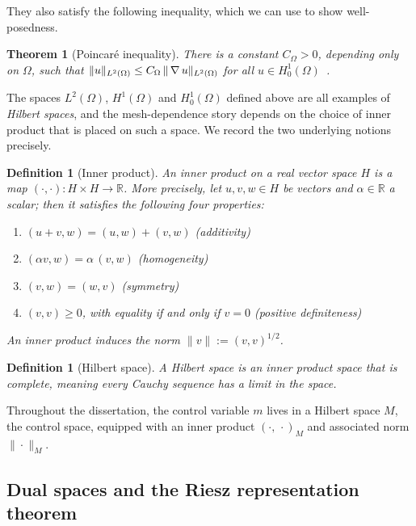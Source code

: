 \documentclass[a4paper,11pt]{article}
\newcommand{\R}{\mathbb{R}}
\newcommand{\Om}{\Omega}
\newcommand{\Lp}[1]{L^{2}(#1)}              %
\newcommand{\inner}[3]{(#1,\,#2)_{#3}}        %
\newcommand{\Mspace}{M}
\theoremstyle{spacedplain} \newtheorem{theorem}[counter]{Theorem} \newtheorem{lemma}[counter]{Lemma} \newtheorem{prop}[counter]{Proposition} \newtheorem{cor}[counter]{Corollary}
\theoremstyle{spaceddefinition} \newtheorem{defn}[counter]{Definition} \newtheorem{example}[counter]{Example} \newtheorem{remark}[counter]{Remark}
\begin{document}
They also satisfy the following inequality, which we can use to show well-posedness.
\begin{theorem}[Poincar\'e inequality]
\label{thm:poincare}
There is a constant $C_\Om > 0$, depending only on $\Om$, such that $\| u \|_{\Lp{\Om}} \le C_\Om\, \| \grad u \|_{\Lp{\Om}}$ for all $u \in H_0^1(\Om)$~\citep{bs2008}.
\end{theorem}

The spaces $\Lp{\Om}$, $H^1(\Om)$ and $H_0^1(\Om)$ defined above are all examples of \emph{Hilbert spaces}, and the mesh-dependence story depends on the choice of inner product that is placed on such a space. We record the two underlying notions precisely.

\begin{defn}[Inner product]
An \emph{inner product} on a real vector space $H$ is a map $(\cdot, \cdot) : H \times H \to \R$. More precisely, let $u, v, w \in H$ be vectors and $\alpha \in \R$ a scalar; then it satisfies the following four properties:
\begin{enumerate}
  \item $(u + v, w) = (u, w) + (v, w)$ \hfill (additivity)
  \item $(\alpha v, w) = \alpha\, (v, w)$ \hfill (homogeneity)
  \item $(v, w) = (w, v)$ \hfill (symmetry)
  \item $(v, v) \ge 0$, with equality if and only if $v = 0$ \hfill (positive definiteness)
\end{enumerate}
An inner product induces the norm $\|v\| := (v, v)^{1/2}$.
\end{defn}

\begin{defn}[Hilbert space]
A \emph{Hilbert space} is an inner product space that is \emph{complete}, meaning every Cauchy sequence has a limit in the space.
\end{defn}

Throughout the dissertation, the control variable $m$ lives in a Hilbert space $\Mspace$, the control space, equipped with an inner product $\inner{\cdot}{\cdot}{\Mspace}$ and associated norm $\|\cdot\|_{\Mspace}$.

\subsection{Dual spaces and the Riesz representation theorem}
\label{sec:prelim:riesz}
\end{document}
